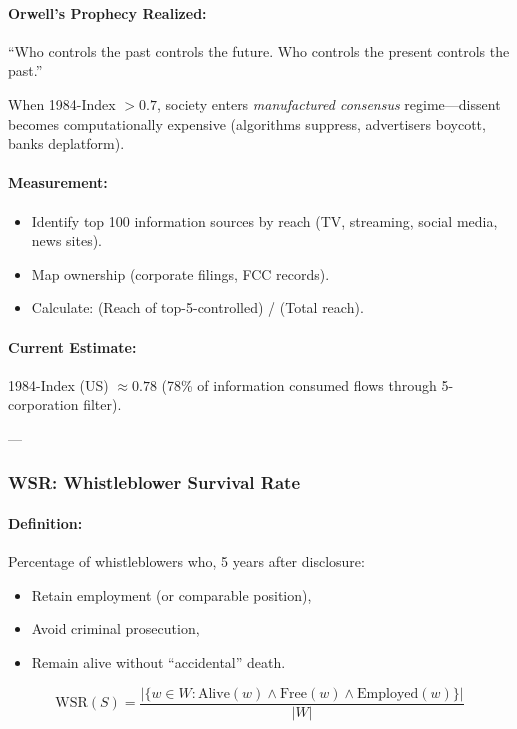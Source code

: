 \documentclass[11pt,a4paper]{article}
\theoremstyle{definition}
\theoremstyle{remark}
\begin{document}
\paragraph{Orwell's Prophecy Realized:}
``Who controls the past controls the future. Who controls the present controls the past.''

When 1984-Index $> 0.7$, society enters \textit{manufactured consensus} regime—dissent becomes computationally expensive (algorithms suppress, advertisers boycott, banks deplatform).

\paragraph{Measurement:}
\begin{itemize}
\item Identify top 100 information sources by reach (TV, streaming, social media, news sites).
\item Map ownership (corporate filings, FCC records).
\item Calculate: (Reach of top-5-controlled) / (Total reach).
\end{itemize}

\paragraph{Current Estimate:}
1984-Index (US) $\approx 0.78$ (78\% of information consumed flows through 5-corporation filter).

---

\subsubsection{WSR: Whistleblower Survival Rate}

\paragraph{Definition:}
Percentage of whistleblowers who, 5 years after disclosure:
\begin{itemize}
\item Retain employment (or comparable position),
\item Avoid criminal prosecution,
\item Remain alive without ``accidental'' death.
\end{itemize}

\[
\text{WSR}(S) = \frac{|\{w \in W : \text{Alive}(w) \land \text{Free}(w) \land \text{Employed}(w)\}|}{|W|}
\]
\end{document}
